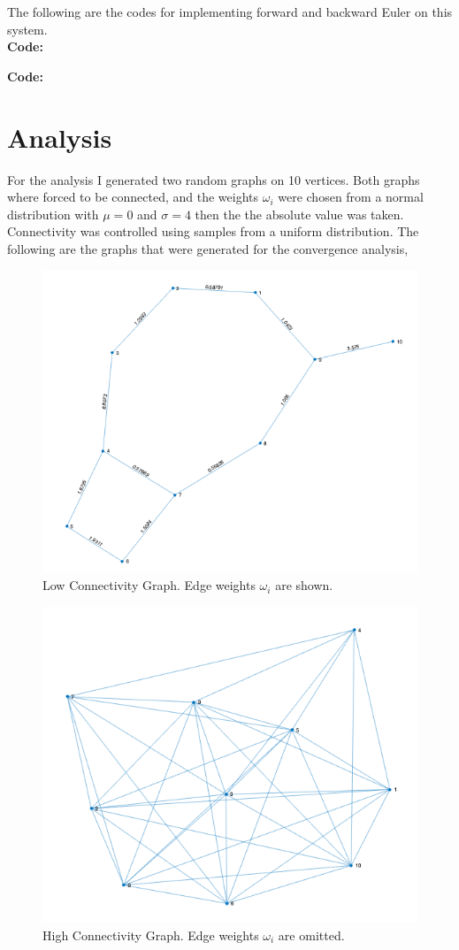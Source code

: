 \documentclass[11pt]{article}
\begin{document}
The following are the codes for implementing forward and backward Euler on this system. \\

\textbf{Code:}
\begin{center}
    
\end{center}

\textbf{Code:}
\begin{center}
    
\end{center}



\section{Analysis} 
For the analysis I generated two random graphs on 10 vertices. Both graphs where forced to be connected, and the weights $\omega_i$ were chosen from 
a normal distribution with $\mu = 0$ and $\sigma = 4$ then the the absolute value was taken. Connectivity was controlled using 
samples from a uniform distribution. The following are the graphs that were generated for the convergence analysis, 

\begin{figure}[H]
    \begin{center}
        \caption{Low Connectivity Graph. Edge weights $\omega_i$ are shown.}
      \includegraphics[width=.60\textwidth]{GLowGraph.png}
    \end{center}
  \end{figure}


\begin{figure}[H]
    \begin{center}
        \caption{High Connectivity Graph. Edge weights $\omega_i$ are omitted.}
      \includegraphics[width=.60\textwidth]{GHighGraph.png}
    \end{center}
  \end{figure}
\end{document}
